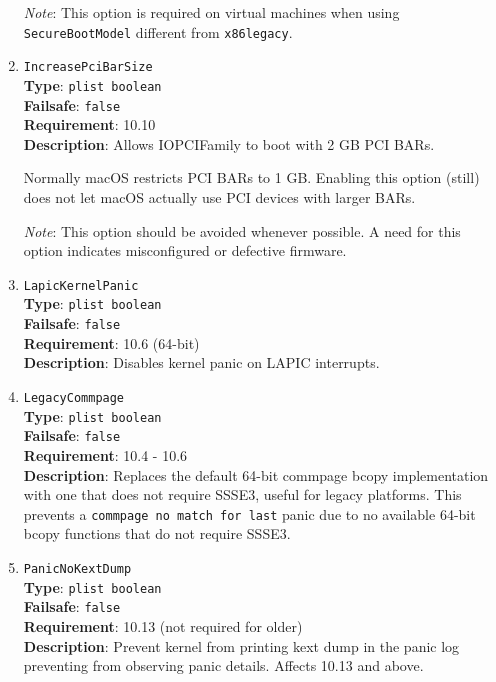 \documentclass[]{article}
\begin{document}
\begin{enumerate}
  \emph{Note}: This option is required on virtual machines when using
  \texttt{SecureBootModel} different from \texttt{x86legacy}.

\item
  \texttt{IncreasePciBarSize}\\
  \textbf{Type}: \texttt{plist\ boolean}\\
  \textbf{Failsafe}: \texttt{false}\\
  \textbf{Requirement}: 10.10\\
  \textbf{Description}: Allows IOPCIFamily to boot with 2 GB PCI BARs.

  Normally macOS restricts PCI BARs to 1 GB. Enabling this option
  (still) does not let macOS actually use PCI devices with larger BARs.

  \emph{Note}: This option should be avoided whenever possible. A need for this option
  indicates misconfigured or defective firmware.

\item
  \texttt{LapicKernelPanic}\\
  \textbf{Type}: \texttt{plist\ boolean}\\
  \textbf{Failsafe}: \texttt{false}\\
  \textbf{Requirement}: 10.6 (64-bit)\\
  \textbf{Description}: Disables kernel panic on LAPIC interrupts.

\item
  \texttt{LegacyCommpage}\\
  \textbf{Type}: \texttt{plist\ boolean}\\
  \textbf{Failsafe}: \texttt{false}\\
  \textbf{Requirement}: 10.4 - 10.6\\
  \textbf{Description}: Replaces the default 64-bit commpage bcopy implementation with
  one that does not require SSSE3, useful for legacy platforms. This prevents a
  \texttt{commpage no match for last} panic due to no available 64-bit bcopy functions
  that do not require SSSE3.

\item
  \texttt{PanicNoKextDump}\\
  \textbf{Type}: \texttt{plist\ boolean}\\
  \textbf{Failsafe}: \texttt{false}\\
  \textbf{Requirement}: 10.13 (not required for older)\\
  \textbf{Description}: Prevent kernel from printing kext dump in the panic
  log preventing from observing panic details. Affects 10.13 and above.


\end{enumerate}
\end{document}
